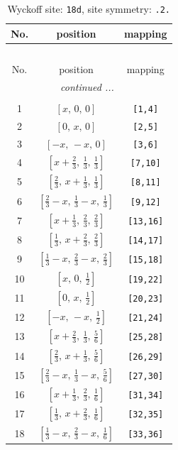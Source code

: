 \documentclass[fleqn,8pt]{jsarticle}
\begin{document}
\begin{longtable}{ccc}
\caption{Wyckoff site: {\tt 18d}, site symmetry: {\tt .2.}}
 \\
 \hline \hline
No. & position & mapping \\ \hline \endfirsthead

\multicolumn{2}{l}{\tablename\ \thetable{}} \\
 \hline \hline
No. & position & mapping \\ \hline \endhead

 \hline \hline
\multicolumn{2}{r}{\footnotesize\it continued ...} \\ \endfoot

 \hline \hline
\multicolumn{2}{r}{} \\ \endlastfoot

1 & $\left[ x,\, 0,\, 0 \right]$ & {\tt [1,4]} \\ \hline
2 & $\left[ 0,\, x,\, 0 \right]$ & {\tt [2,5]} \\ \hline
3 & $\left[ - x,\, - x,\, 0 \right]$ & {\tt [3,6]} \\ \hline
4 & $\left[ x + \frac{2}{3},\, \frac{1}{3},\, \frac{1}{3} \right]$ & {\tt [7,10]} \\ \hline
5 & $\left[ \frac{2}{3},\, x + \frac{1}{3},\, \frac{1}{3} \right]$ & {\tt [8,11]} \\ \hline
6 & $\left[ \frac{2}{3} - x,\, \frac{1}{3} - x,\, \frac{1}{3} \right]$ & {\tt [9,12]} \\ \hline
7 & $\left[ x + \frac{1}{3},\, \frac{2}{3},\, \frac{2}{3} \right]$ & {\tt [13,16]} \\ \hline
8 & $\left[ \frac{1}{3},\, x + \frac{2}{3},\, \frac{2}{3} \right]$ & {\tt [14,17]} \\ \hline
9 & $\left[ \frac{1}{3} - x,\, \frac{2}{3} - x,\, \frac{2}{3} \right]$ & {\tt [15,18]} \\ \hline
10 & $\left[ x,\, 0,\, \frac{1}{2} \right]$ & {\tt [19,22]} \\ \hline
11 & $\left[ 0,\, x,\, \frac{1}{2} \right]$ & {\tt [20,23]} \\ \hline
12 & $\left[ - x,\, - x,\, \frac{1}{2} \right]$ & {\tt [21,24]} \\ \hline
13 & $\left[ x + \frac{2}{3},\, \frac{1}{3},\, \frac{5}{6} \right]$ & {\tt [25,28]} \\ \hline
14 & $\left[ \frac{2}{3},\, x + \frac{1}{3},\, \frac{5}{6} \right]$ & {\tt [26,29]} \\ \hline
15 & $\left[ \frac{2}{3} - x,\, \frac{1}{3} - x,\, \frac{5}{6} \right]$ & {\tt [27,30]} \\ \hline
16 & $\left[ x + \frac{1}{3},\, \frac{2}{3},\, \frac{1}{6} \right]$ & {\tt [31,34]} \\ \hline
17 & $\left[ \frac{1}{3},\, x + \frac{2}{3},\, \frac{1}{6} \right]$ & {\tt [32,35]} \\ \hline
18 & $\left[ \frac{1}{3} - x,\, \frac{2}{3} - x,\, \frac{1}{6} \right]$ & {\tt [33,36]} \\
\end{longtable}
\end{document}
